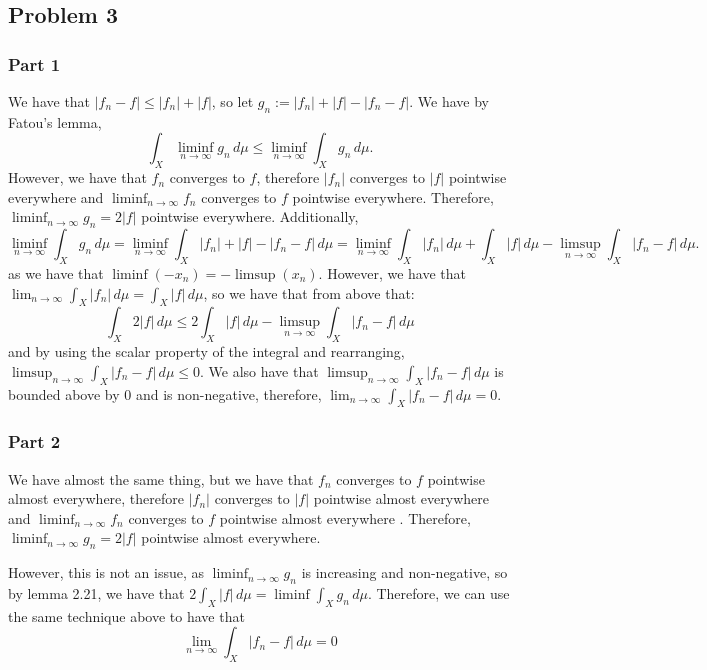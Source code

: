\documentclass{article}
\theoremstyle{definition}
\numberwithin{theorem}{section}
\numberwithin{equation}{section}
\newcommand{\intd}{\, d}
\begin{document}
\subsection{Problem 3}
\subsubsection{Part 1}
We have that $|f_n - f| \leq |f_n| + |f|$, so let $g_n := |f_n| + |f| - |f_n - f|$. We have by Fatou's lemma,
\begin{equation}
	\int_X \liminf_{n \rightarrow \infty} g_n \intd \mu \leq \liminf_{n \rightarrow \infty} \int_X g_n \intd \mu.
\end{equation}
However, we have that $f_n$ converges to $f$, therefore $|f_n|$ converges to $|f|$ pointwise everywhere and  $\liminf_{n \rightarrow \infty} f_n$ converges to $f$ pointwise everywhere. Therefore, $\liminf_{n \rightarrow \infty} g_n = 2 |f|$ pointwise everywhere. Additionally, 
\begin{equation}
	\liminf_{n \rightarrow \infty} \int_X g_n \intd \mu = \liminf_{n \rightarrow \infty} \int_X |f_n| + |f| - |f_n - f| \intd \mu = \liminf_{n \rightarrow \infty} \int_X |f_n| \intd \mu + \int_X |f| \intd \mu - 
	\limsup_{n \rightarrow \infty} \int_X |f_n - f| \intd \mu.
\end{equation}
as we have that $\liminf(-x_n) = - \limsup (x_n)$. 
However, we have that $\lim_{n \rightarrow \infty} \int_X |f_n| \intd \mu = \int_X |f| \intd \mu$, so we have that from above that:
\begin{equation}
	\int_X 2 |f| \intd \mu \leq 2 \int_X |f| \intd \mu -  \limsup_{n \rightarrow \infty} \int_X |f_n - f| \intd \mu
\end{equation}
and by using the scalar property of the integral and rearranging,
 $\limsup_{n \rightarrow \infty} \int_X |f_n - f| \intd \mu \leq 0$. We also have that $\limsup_{n \rightarrow \infty} \int_X |f_n - f| \intd \mu$ is bounded above by $0$ and is non-negative, therefore, $\lim_{n \rightarrow \infty} \int_X |f_n - f| \intd \mu = 0$. 
\subsubsection{Part 2}
We have almost the same thing, but we have that
$f_n$ converges to $f$ pointwise almost everywhere, therefore $|f_n|$ converges to $|f|$ pointwise almost everywhere and  $\liminf_{n \rightarrow \infty} f_n$ converges to $f$ pointwise almost everywhere . Therefore, $\liminf_{n \rightarrow \infty} g_n = 2 |f|$ pointwise almost everywhere.

However, this is not an issue, as $\liminf_{n \rightarrow \infty} g_n$ is increasing and non-negative, so by lemma 2.21, we have that $2 \int_X |f| \intd \mu = \liminf \int_X g_n \intd \mu$. Therefore, we can use the same technique above to have that
\begin{equation}
	\lim_{n \rightarrow \infty} \int_X |f_n - f| \intd \mu = 0
\end{equation}
\end{document}
